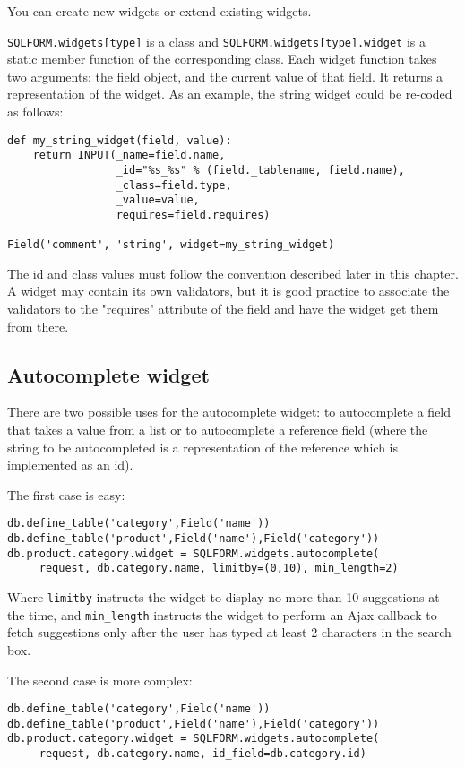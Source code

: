 \documentclass[justified,sixbynine,notoc]{tufte-book}
\def\ft{\small\tt}
\def\inxx#1{\index{#1}}
\begin{document}
\begin{fullwidth}
You can create new widgets or extend existing widgets.

{\ft SQLFORM.widgets[type]} is a class and {\ft SQLFORM.widgets[type].widget} is a static member function of the corresponding class. Each widget function takes two arguments: the field object, and the current value of that field. It returns a representation of the widget. As an example, the string widget could be re-coded as follows:
\begin{lstlisting}
def my_string_widget(field, value):
    return INPUT(_name=field.name,
                 _id="%s_%s" % (field._tablename, field.name),
                 _class=field.type,
                 _value=value,
                 requires=field.requires)

Field('comment', 'string', widget=my_string_widget)
\end{lstlisting}

The id and class values must follow the convention described later in this chapter. A widget may contain its own validators, but it is good practice to associate the validators to the "requires" attribute of the field and have the widget get them from there.

\goodbreak\subsection{Autocomplete widget}

\inxx{autocomplete}

There are two possible uses for the autocomplete widget: to autocomplete a field that takes a value from a list or to autocomplete a reference field (where the string to be autocompleted is a representation of the reference which is implemented as an id).

The first case is easy:
\begin{lstlisting}
db.define_table('category',Field('name'))
db.define_table('product',Field('name'),Field('category'))
db.product.category.widget = SQLFORM.widgets.autocomplete(
     request, db.category.name, limitby=(0,10), min_length=2)
\end{lstlisting}

Where {\ft limitby} instructs the widget to display no more than 10 suggestions at the time, and {\ft min\_length} instructs the widget to perform an Ajax callback to fetch suggestions only after the user has typed at least 2 characters in the search box.

The second case is more complex:
\begin{lstlisting}
db.define_table('category',Field('name'))
db.define_table('product',Field('name'),Field('category'))
db.product.category.widget = SQLFORM.widgets.autocomplete(
     request, db.category.name, id_field=db.category.id)
\end{lstlisting}


\end{fullwidth}
\end{document}
